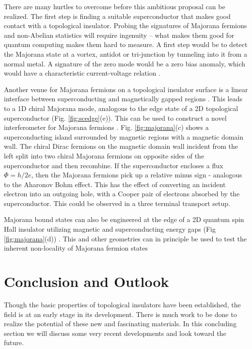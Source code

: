 \documentclass[twocolumn,floatfix,showpacs,rmp,aps]{revtex4}
\begin{document}
There are many hurtles to overcome before this ambitious proposal can be realized.
The first step is finding a suitable superconductor that makes good
contact with a topological insulator.  Probing the signatures of
Majorana fermions and non-Abelian statistics will require ingenuity
-- what makes them good for quantum computing makes them
hard to measure.  A first step would be to detect the
Majorana state at a vortex,  antidot or tri-junction by tunneling into
it from a normal metal.  A signature of the zero mode would
be a zero bias anomaly, which would have a characteristic
current-voltage relation \cite{bolech07,law09}.

Another venue for Majorana fermions on a topological insulator surface is a
linear interface between superconducting and magnetically gapped regions
\cite{fukane08,tanaka09,linder10}.  This
leads to a 1D chiral Majorana mode, analogous to the edge state of
a 2D topological superconductor (Fig. \ref{fig:scedge}(e)).  This can
be used to construct a novel interferometer for Majorana
fermions \cite{fukane09b,akhmerov09}.  Fig. \ref{fig:majorana}(c) shows a
superconducting island surrounded by magnetic regions with a magnetic
domain wall.  The chiral Dirac fermions on the magnetic domain wall
incident from the left split into two chiral Majorana fermions on opposite sides of the
superconductor and then recombine.  If the superconductor encloses a
flux $\Phi=h/2e$, then the Majorana fermions pick up a relative minus
sign - analogous to the Aharonov Bohm effect.  This has the effect of
converting an incident electron into an outgoing hole, with a Cooper
pair of electrons absorbed by the superconductor.  This could be
observed in a three terminal transport setup.

Majorana bound states can also be engineered at the edge of a 2D quantum spin Hall insulator
utilizing magnetic and superconducting energy gaps
(Fig \ref{fig:majorana}(d)) \cite{fukane09a,nilsson08}.  This and other geometries
can in principle be used to test the inherent non-locality of Majorana fermion
states \cite{fu10}

\section{Conclusion and Outlook}
\label{sec:outlook}

Though the basic properties of topological insulators have been
established, the field is at an early stage
in its development.  There is much work to be done to
realize the potential of these new and fascinating materials.
In this concluding section we will discuss some very recent
developments and look toward the future.
\end{document}

